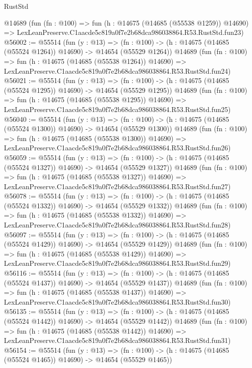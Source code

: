 \begin{lexlean}{RustStd}
\begin{coremodule}
    @14689
    (fun (fn : @100) =>
    fun (h : @14675 (@14685 (@55538 @1259)) @14690) =>
    LexLeanPreserve.C1aacde5c819a0f7e2b68dca986038864.R53.RustStd.fun23)
@56002 := @55514
    (fun (y : @13) =>
    (fn : @100) -> (h : @14675 (@14685 (@55524 @1264)) @14690) -> @14654 (@55529 @1264))
    @14689
    (fun (fn : @100) =>
    fun (h : @14675 (@14685 (@55538 @1264)) @14690) =>
    LexLeanPreserve.C1aacde5c819a0f7e2b68dca986038864.R53.RustStd.fun24)
@56021 := @55514
    (fun (y : @13) =>
    (fn : @100) -> (h : @14675 (@14685 (@55524 @1295)) @14690) -> @14654 (@55529 @1295))
    @14689
    (fun (fn : @100) =>
    fun (h : @14675 (@14685 (@55538 @1295)) @14690) =>
    LexLeanPreserve.C1aacde5c819a0f7e2b68dca986038864.R53.RustStd.fun25)
@56040 := @55514
    (fun (y : @13) =>
    (fn : @100) -> (h : @14675 (@14685 (@55524 @1300)) @14690) -> @14654 (@55529 @1300))
    @14689
    (fun (fn : @100) =>
    fun (h : @14675 (@14685 (@55538 @1300)) @14690) =>
    LexLeanPreserve.C1aacde5c819a0f7e2b68dca986038864.R53.RustStd.fun26)
@56059 := @55514
    (fun (y : @13) =>
    (fn : @100) -> (h : @14675 (@14685 (@55524 @1327)) @14690) -> @14654 (@55529 @1327))
    @14689
    (fun (fn : @100) =>
    fun (h : @14675 (@14685 (@55538 @1327)) @14690) =>
    LexLeanPreserve.C1aacde5c819a0f7e2b68dca986038864.R53.RustStd.fun27)
@56078 := @55514
    (fun (y : @13) =>
    (fn : @100) -> (h : @14675 (@14685 (@55524 @1332)) @14690) -> @14654 (@55529 @1332))
    @14689
    (fun (fn : @100) =>
    fun (h : @14675 (@14685 (@55538 @1332)) @14690) =>
    LexLeanPreserve.C1aacde5c819a0f7e2b68dca986038864.R53.RustStd.fun28)
@56097 := @55514
    (fun (y : @13) =>
    (fn : @100) -> (h : @14675 (@14685 (@55524 @1429)) @14690) -> @14654 (@55529 @1429))
    @14689
    (fun (fn : @100) =>
    fun (h : @14675 (@14685 (@55538 @1429)) @14690) =>
    LexLeanPreserve.C1aacde5c819a0f7e2b68dca986038864.R53.RustStd.fun29)
@56116 := @55514
    (fun (y : @13) =>
    (fn : @100) -> (h : @14675 (@14685 (@55524 @1437)) @14690) -> @14654 (@55529 @1437))
    @14689
    (fun (fn : @100) =>
    fun (h : @14675 (@14685 (@55538 @1437)) @14690) =>
    LexLeanPreserve.C1aacde5c819a0f7e2b68dca986038864.R53.RustStd.fun30)
@56135 := @55514
    (fun (y : @13) =>
    (fn : @100) -> (h : @14675 (@14685 (@55524 @1442)) @14690) -> @14654 (@55529 @1442))
    @14689
    (fun (fn : @100) =>
    fun (h : @14675 (@14685 (@55538 @1442)) @14690) =>
    LexLeanPreserve.C1aacde5c819a0f7e2b68dca986038864.R53.RustStd.fun31)
@56154 := @55514
    (fun (y : @13) =>
    (fn : @100) -> (h : @14675 (@14685 (@55524 @1465)) @14690) -> @14654 (@55529 @1465))

\end{coremodule}
\end{lexlean}

